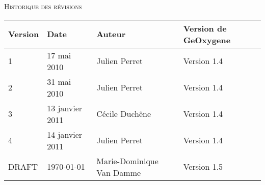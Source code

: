 
\begin{center}

\textsc{\Large Historique des révisions}\\[0.5cm]

\bigskip
\bigskip
\bigskip

\begin{tabular}[!t]{|l||l|l|l|}
\hline
\textbf{Version}&\textbf{Date}&\textbf{Auteur}&\textbf{Version de GeOxygene}\\
\hline
\hline
1&17 mai 2010&Julien Perret&Version 1.4\\
2&31 mai 2010&Julien Perret&Version 1.4\\
3&13 janvier 2011&Cécile Duch\^ene&Version 1.4\\
4&14 janvier 2011&Julien Perret&Version 1.4\\
DRAFT&\today&Marie-Dominique Van Damme&Version 1.5\\
\hline
\end{tabular} 

\end{center}
